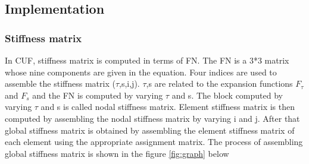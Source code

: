 \documentclass[a4paper,12pt]{article}
\begin{document}
\subsection*{Implementation}
\subsubsection*{Stiffness matrix}
\indent\indent In CUF, stiffness matrix is computed in terms of FN. The FN is a 3*3 matrix whose nine components are given in the equation. Four indices are used to assemble the stiffness matrix ($\tau$,s,i,j). $\tau$,s are related to the expansion functions $F_{\tau}$ and $F_{s}$ and the FN is computed by varying $\tau$ and s. The block computed by varying $\tau$ and s is called nodal stiffness matrix. Element stiffness matrix is then computed by assembling the nodal stiffness matrix by varying i and j. After that global stiffness matrix is obtained by assembling the element stiffness matrix of each element using the appropriate assignment matrix. The process of assembling global stiffness matrix is shown in the figure \ref{fig:graph} below
\end{document}

